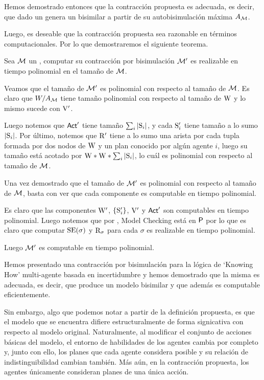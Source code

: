 Hemos demostrado entonces que la contracción propuesta es adecuada, es decir, que dado un \ults genera un \ults bisimilar a partir de su 
autobisimulación máxima $A_\modults$.

Luego, es deseable que la contracción propuesta sea razonable en términos computacionales. Por lo que demostraremos el siguiente teorema.


\begin{teorema}
    Sea $\modults$ un \ults, computar su contracción por bisimulación $\modults'$ es realizable en tiempo polinomial en el 
    tamaño de $\modults$.
\end{teorema}

\begin{demostracion}
    Veamos que el tamaño de $\modults'$ es polinomial con respecto al tamaño de $\modults$. Es claro que $W/A_\modults$ tiene tamaño polinomial con 
    respecto al tamaño de $\W$ y lo mismo sucede con $\V'$. 

    Luego notemos que $\ACT'$ tiene tamaño $\sum_{i} |\S_i|$, y cada $\S_i'$ tiene tamaño a lo sumo $|\S_i|$. Por último, notemos que $\R'$ tiene a lo 
    sumo una arista por cada tupla formada por dos nodos de $\W$ y un plan conocido por algún agente $i$, luego su tamaño está acotado por 
    $\W * \W * \sum_{i}|\S_i|$, lo cuál es polinomial con respecto al tamaño de $\modults$.

    Una vez demostrado que el tamaño de $\modults'$ es polinomial con respecto al tamaño de $\modults$, basta con ver que cada componente es computable en 
    tiempo polinomial. 

    Es claro que las componentes $\W'$, $\{\S_i'\}$, $\V'$ y $\ACT'$ son computables en tiempo polinomial. Luego notemos que por 
    , Model Checking está en $\Poly$ por lo que es claro que computar $\sexec(\sigma)$ y $\R_\sigma$
    para cada $\sigma$ es realizable en tiempo polinomial.

    Luego $\modults'$ es computable en tiempo polinomial.
\end{demostracion}

Hemos presentado una contracción por bisimulación para la lógica de `Knowing How' multi-agente basada en incertidumbre y hemos demostrado que 
la misma es adecuada, es decir, que produce un modelo bisimilar y que además es computable eficientemente.

Sin embargo, algo que podemos notar a partir de la definición propuesta, es que el modelo que se encuentra difiere estructuralmente de 
forma signicativa con respecto al modelo original. 
Naturalmente, al modificar el conjunto de acciones básicas del modelo, el entorno de habilidades de los agentes cambia por completo y, junto con ello, 
los planes que cada agente considera posible y su relación de indistinguibilidad cambian también. Más aún, en la contracción propuesta, los agentes 
únicamente consideran planes de una única acción.

